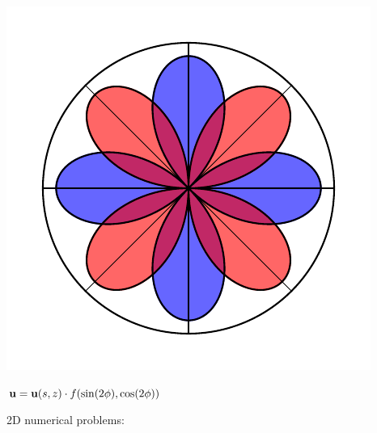 \documentclass{article}
\renewcommand{\vec}[1]{\ensuremath{\mathbf{#1}}}
\begin{document}
\begin{center}
\begin{minipage}[t]{0.4\paperwidth}
        \begin{minipage}[c]{0.1\paperwidth}
            \includegraphics[width=\textwidth]{radpat_quad.pdf}
        \end{minipage}%
        \begin{minipage}[c]{0.4\paperwidth}
            $\scriptsize{\vec u = \vec u (s,z)} \cdot f(\sin(2\phi), \cos(2\phi))$ \\
        \end{minipage}%
    \end{minipage}%
    \begin{minipage}[t]{0.25\paperwidth}
        2D numerical problems:


\end{minipage}
\end{center}
\end{document}
